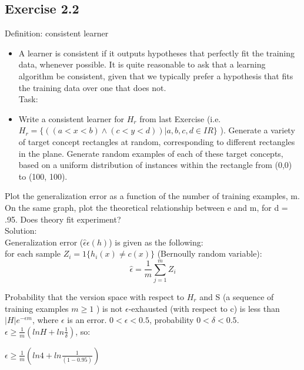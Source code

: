 \documentclass[a4paper, 12pt]{article}
\begin{document}
\subsection*{Exercise 2.2}

Definition: consistent learner

\begin{itemize}
\item A learner is consistent if it outputs hypotheses that perfectly fit the training data, whenever possible. It is quite reasonable to ask that a learning algorithm be consistent, given that we typically prefer a hypothesis that fits the training data over one that does not. \\

Task:
\item Write a consistent learner for $H_r$ from last Exercise (i.e. $H_r = \{((a < x < b) \wedge (c < y < d)) | a, b, c, d \in IR\}$ ). Generate a variety of target concept rectangles at random, corresponding to different rectangles in the plane. Generate random examples of each of these target concepts, based on a uniform distribution of instances within the rectangle from (0,0) to (100, 100).

\end{itemize}

Plot the generalization error  as a function of the number of training examples, m. On the same graph, plot the theoretical relationship between e and m, for d = .95. Does theory fit experiment?\\

Solution:\\

Generalization error ($ \hat{\epsilon}\epsilon (h)$) is given as the following:\\

for each sample $Z_i = 1\{ h_i(x) \neq c(x) \}$ (Bernoully random variable):\\

$$\hat{\epsilon} = \frac{1}{m}\sum_{j=1}^{m} Z_i$$

Probability that the version space with respect to $H_r$ and S (a sequence of training examples $m\geqslant 1$ ) is not $\epsilon$-exhausted (with respect to c) is less than $|H| e^{-\epsilon m}$, where  $\epsilon$ is an error. $0<\epsilon<0.5$, probability $0<\delta<0.5$.\\

$\epsilon \geqslant \frac{1}{m}(lnH + ln\frac{1}{\delta})$, so:

$\epsilon \geqslant \frac{1}{m}(ln4 + ln\frac{1}{(1-0.95)})$
\end{document}
